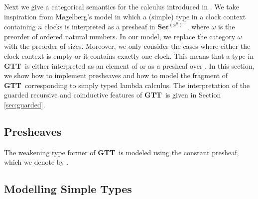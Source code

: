 \documentclass[a4paper,UKenglish,cleveref, autoref,numberwithinsect]{lipics-v2019}
\newcommand{\AD}[1]{\AgdaDatatype{#1}}
\newcommand{\AF}[1]{\AgdaFunction{#1}}
\newcommand{\IC}{\AgdaInductiveConstructor}
\newcommand{\F}{\AgdaFunction}
\newcommand{\GTT}{\textbf{GTT}}
\newcommand{\Set}{\mathbf{Set}}
\begin{document}
Next we give a categorical semantics for the calculus introduced in
.  We take inspiration from M{\o}gelberg's model
\cite{Mogelberg14} in which a (simple) type in a clock context
containing $n$ clocks is interpreted
as a presheaf in $\Set^{(\omega^n)^{\text{op}}}$, where $\omega$ is
the preorder of ordered natural numbers. In our model, we replace the
category $\omega$ with the preorder of sizes. Moreover, we only
consider the cases where either the clock context is empty or it
contains exactly one clock. This means that a type in \GTT\ is either
interpreted as an element of \F{Set} or as a presheaf over \F{Size}. 
In this section, we show how to implement presheaves and how to model
the fragment of \GTT\ corresponding to simply typed lambda
calculus. The interpretation of the guarded recursive and coinductive
features of \GTT\ is given in Section \ref{sec:guarded}.

\subsection{Presheaves}
\label{sec:presheaves}





The weakening type former \IC{↑} of \GTT\ is modeled using the constant presheaf, which we denote by \AF{Const}.


\subsection{Modelling Simple Types}
\label{sec:kripke}




%
\end{document}
